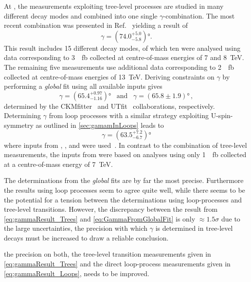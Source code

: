 At \lhcb, the measurements exploiting tree-level processes are studied in many different decay modes and combined into one single $\gamma$-combination.
The most recent combination was presented in Ref.~\cite{GammCombo} yielding a result of
\begin{equation}
\gamma=\left(74.0^{+5.0}_{-5.8}\right)\!\si{\degree}.\label{eq:gammaResult_Trees}
\end{equation}
This result includes \num{15} different decay modes, of which ten were analysed using data corresponding to \SI{3}{\per\femto\barn} collected at centre-of-mass energies of \num{7} and \SI{8}{\tera\electronvolt}.
The remaining five measurements use additional data corresponding to \SI{2}{\per\femto\barn} collected at centre-of-mass energies of \SI{13}{\tera\electronvolt}.
Deriving constraints on $\gamma$ by performing a \emph{global} fit using all available inputs gives
\begin{equation}
\gamma=\left(65.4^{+0.97}_{-1.16}\right)\!\si{\degree}\,\,\,\,\,\text{and}\,\,\,\,\,\gamma=\left(65.8\pm1.9\right)\!\si{\degree}\,,\label{eq:GammaFromGlobalFit}
\end{equation}
determined by the CKMfitter~\cite{CKMfitter2015} and UTfit~\cite{UTfit-UT} collaborations, respectively.
Determining $\gamma$ from loop processes with a similar strategy exploiting U-spin-symmetry as outlined in \cref{sec:gamamInLoops} leads to
\begin{equation}
\gamma=\left(63.5^{+7.2}_{-6.7}\right)\!\si{\degree}\label{eq:gammaResult_Loops}
\end{equation}
where inputs from \babar, \belle, \cdf and \lhcb were used~\cite{Aaij:2014xba}. In contrast to the combination of tree-level measurements, the inputs from \lhcb were based on analyses using only \SI{1}{\per\femto\barn} collected at a centre-of-mass energy of \SI{7}{\tera\electronvolt}.

The determinations from the \emph{global} fits are by far the most precise.
Furthermore the results using loop processes seem to agree quite well, while there seems to be the potential for a tension between the determinations using loop-processes and tree-level transitions.
However, the discrepancy between the result from \cref{eq:gammaResult_Trees} and \cref{eq:GammaFromGlobalFit} is only $\approx1.5\sigma$ due to the large uncertainties, \ie the precision with which $\gamma$ is determined in tree-level decays must be increased to draw a reliable conclusion.

 the precision on both, the tree-level transition measurements given in \cref{eq:gammaResult_Trees} and the direct loop-process measurements given in \cref{eq:gammaResult_Loops}, needs to be improved.

